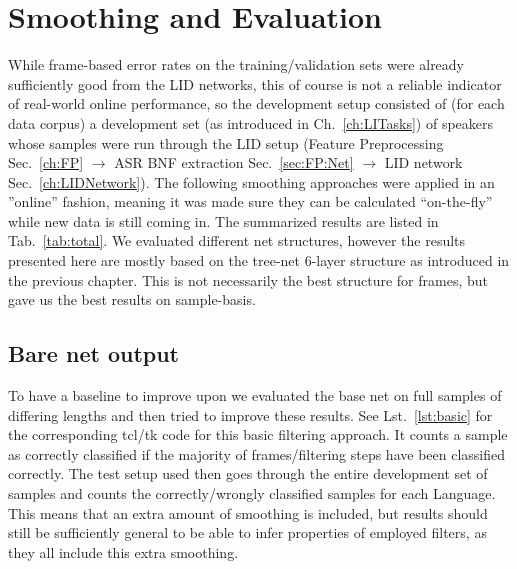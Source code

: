 \chapter{Smoothing and Evaluation}
\label{ch:eval}

While frame-based error rates on the training/validation sets were already sufficiently good from the LID networks, this of course is not a reliable indicator of real-world online performance, so the development setup consisted of (for each data corpus) a development set (as introduced in Ch.~\ref{ch:LITasks}) of speakers whose samples were run through the LID setup (Feature Preprocessing Sec.~\ref{ch:FP} $\rightarrow$ ASR BNF extraction Sec.~\ref{sec:FP:Net} $\rightarrow$ LID network Sec.~\ref{ch:LIDNetwork}). The following smoothing approaches were applied in an ''online'' fashion, meaning it was made sure they can be calculated ``on-the-fly'' while new data is still coming in. The summarized results are listed in Tab.~\ref{tab:total}. We evaluated different net structures, however the results presented here are mostly based on the tree-net 6-layer structure as introduced in the previous chapter. This is not necessarily the best structure for frames, but gave us the best results on sample-basis.

\section{Bare net output}
\label{sec:eval:bare}

To have a baseline to improve upon we evaluated the base net on full samples of differing lengths and then tried to improve these results. See Lst.~\ref{lst:basic} for the corresponding tcl/tk code for this basic filtering approach. It counts a sample as correctly classified if the majority of frames/filtering steps have been classified correctly. The test setup used then goes through the entire development set of samples and counts the correctly/wrongly classified samples for each Language. This means that an extra amount of smoothing is included, but results should still be sufficiently general to be able to infer properties of employed filters, as they all include this extra smoothing.


